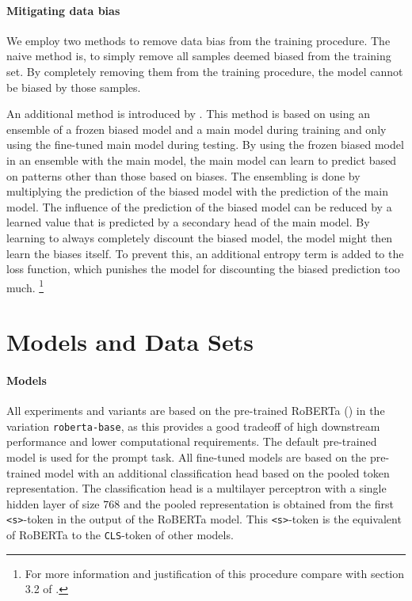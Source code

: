 \documentclass[12pt,a4paper]{article}
\begin{document}
\paragraph{Mitigating data bias}

We employ two methods to remove data bias from the training procedure. The naive method is, to simply remove all samples deemed biased from the training set. By completely removing them from the training procedure, the model cannot be biased by those samples.

An additional method is introduced by \cite{clark2019don}. This method is based on using an ensemble of a frozen biased model and a main model during training and only using the fine-tuned main model during testing. By using the frozen biased model in an ensemble with the main model, the main model can learn to predict based on patterns other than those based on biases. The ensembling is done by multiplying the prediction of the biased model with the prediction of the main model. The influence of the prediction of the biased model can be reduced by a learned value that is predicted by a secondary head of the main model. By learning to always completely discount the biased model, the model might then learn the biases itself. To prevent this, an additional entropy term is added to the loss function, which punishes the model for discounting the biased prediction too much. \footnote{For more information and justification of this procedure compare with section 3.2 of \cite{clark2019don}.}

\section{Models and Data Sets} \label{sec:models_datasets}
\paragraph{Models}
All experiments and variants are based on the pre-trained \acf{RoBERTa} (\cite{roberta}) in the variation \texttt{roberta-base}, as this provides a good tradeoff of high downstream performance and lower computational requirements. The default pre-trained model is used for the prompt task. All fine-tuned models are based on the pre-trained model with an additional classification head based on the pooled token representation. The classification head is a multilayer perceptron with a single hidden layer of size $768$ and the pooled representation is obtained from the first \texttt{<s>}-token in the output of the \acs{RoBERTa} model. This \texttt{<s>}-token is the equivalent of \acs{RoBERTa} to the \texttt{CLS}-token of other models.
\end{document}
